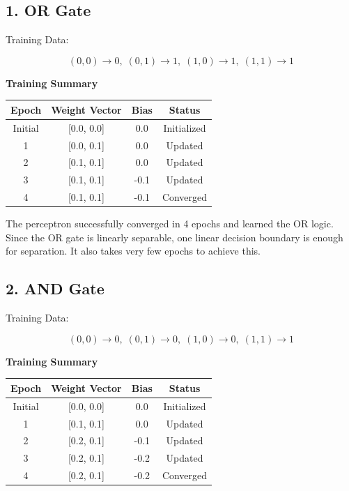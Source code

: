 \documentclass[11pt]{article}
\begin{document}
\subsection*{1. OR Gate}

Training Data:

\[
(0,0)\rightarrow0,\;
(0,1)\rightarrow1,\;
(1,0)\rightarrow1,\;
(1,1)\rightarrow1
\]

\vspace{2mm}

\textbf{Training Summary}

\begin{center}
\begin{tabular}{|c|c|c|c|}
\hline
Epoch & Weight Vector & Bias & Status\\
\hline
Initial & [0.0, 0.0] & 0.0 & Initialized\\
\hline
1 & [0.0, 0.1] & 0.0 & Updated\\
\hline
2 & [0.1, 0.1] & 0.0 & Updated\\
\hline
3 & [0.1, 0.1] & -0.1 & Updated\\
\hline
4 & [0.1, 0.1] & -0.1 & Converged\\
\hline
\end{tabular}
\end{center}

The perceptron successfully converged in 4 epochs and learned the OR logic. Since the OR gate is linearly separable, one linear decision boundary is enough for separation. It also takes very few epochs to achieve this.

\vspace{5mm}


\subsection*{2. AND Gate}

Training Data:

\[
(0,0)\rightarrow0,\;
(0,1)\rightarrow0,\;
(1,0)\rightarrow0,\;
(1,1)\rightarrow1
\]

\vspace{2mm}

\textbf{Training Summary}

\begin{center}
\begin{tabular}{|c|c|c|c|}
\hline
Epoch & Weight Vector & Bias & Status\\
\hline
Initial & [0.0, 0.0] & 0.0 & Initialized\\
\hline
1 & [0.1, 0.1] & 0.0 & Updated\\
\hline
2 & [0.2, 0.1] & -0.1 & Updated\\
\hline
3 & [0.2, 0.1] & -0.2 & Updated\\
\hline
4 & [0.2, 0.1] & -0.2 & Converged\\
\hline
\end{tabular}
\end{center}
\end{document}
